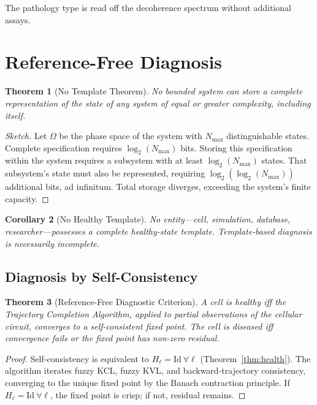\documentclass[twocolumn,10pt,a4paper]{article}
\newtheorem{theorem}{Theorem}[section]
\newtheorem{corollary}[theorem]{Corollary}
\theoremstyle{definition}
\theoremstyle{remark}
\newcommand{\Hol}{H}
\begin{document}
The pathology type is read off the decoherence spectrum without additional assays.

\section{Reference-Free Diagnosis}

\begin{theorem}[No Template Theorem]
No bounded system can store a complete representation of the state of any system of equal or greater complexity, including itself.
\end{theorem}

\begin{proof}[Sketch]
Let $\Omega$ be the phase space of the system with $N_{\max}$ distinguishable states. Complete specification requires $\log_2(N_{\max})$ bits. Storing this specification within the system requires a subsystem with at least $\log_2(N_{\max})$ states. That subsystem's state must also be represented, requiring $\log_2(\log_2(N_{\max}))$ additional bits, ad infinitum. Total storage diverges, exceeding the system's finite capacity.
\end{proof}

\begin{corollary}[No Healthy Template]
No entity---cell, simulation, database, researcher---possesses a complete healthy-state template. Template-based diagnosis is necessarily incomplete.
\end{corollary}

\subsection{Diagnosis by Self-Consistency}

\begin{theorem}[Reference-Free Diagnostic Criterion]
A cell is healthy iff the Trajectory Completion Algorithm, applied to partial observations of the cellular circuit, converges to a self-consistent fixed point. The cell is diseased iff convergence fails or the fixed point has non-zero residual.
\end{theorem}

\begin{proof}
Self-consistency is equivalent to $\Hol_\ell = \mathrm{Id}\ \forall\ell$ (Theorem~\ref{thm:health}). The algorithm iterates fuzzy KCL, fuzzy KVL, and backward-trajectory consistency, converging to the unique fixed point by the Banach contraction principle. If $\Hol_\ell = \mathrm{Id}\ \forall\ell$, the fixed point is crisp; if not, residual remains.
\end{proof}
\end{document}
